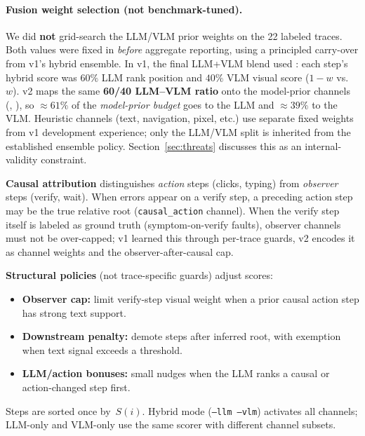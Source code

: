 \documentclass[sigconf,nonacm]{acmart}
\begin{document}
\paragraph{Fusion weight selection (not benchmark-tuned).}
We did \textbf{not} grid-search the LLM/VLM prior weights on the 22 labeled traces.
Both values were fixed in  \emph{before} aggregate reporting, using a principled carry-over from v1's hybrid ensemble.
In v1, the final LLM+VLM blend used : each step's hybrid score was $60\%$ LLM rank position and $40\%$ VLM visual score ($1-w$ vs.\ $w$).
v2 maps the same \textbf{60/40 LLM--VLM ratio} onto the model-prior channels (, ), so ${\approx}61\%$ of the \emph{model-prior budget} goes to the LLM and ${\approx}39\%$ to the VLM.
Heuristic channels (text, navigation, pixel, etc.) use separate fixed weights from v1 development experience; only the LLM/VLM split is inherited from the established ensemble policy.
Section~\ref{sec:threats} discusses this as an internal-validity constraint.

\textbf{Causal attribution} distinguishes \emph{action} steps (clicks, typing) from \emph{observer} steps (verify, wait).
When errors appear on a verify step, a preceding action step may be the true relative root (\texttt{causal\_action} channel).
When the verify step itself is labeled as ground truth (symptom-on-verify faults), observer channels must not be over-capped; v1 learned this through per-trace guards, v2 encodes it as channel weights and the observer-after-causal cap.

\textbf{Structural policies} (not trace-specific guards) adjust scores:
\begin{itemize}
  \item \textbf{Observer cap:} limit verify-step visual weight when a prior causal action step has strong text support.
  \item \textbf{Downstream penalty:} demote steps after inferred root, with exemption when text signal exceeds a threshold.
  \item \textbf{LLM/action bonuses:} small nudges when the LLM ranks a causal or action-changed step first.
\end{itemize}

Steps are sorted once by~$S(i)$.
Hybrid mode (\texttt{--llm --vlm}) activates all channels; LLM-only and VLM-only use the same scorer with different channel subsets.
\end{document}
